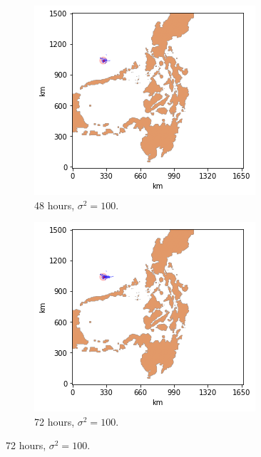 \documentclass[11pt, english]{article}
\begin{document}
\begin{multicols}{2}
\begin{figure}
	\begin{subfigure}{0.33\textwidth}
		\centering
		\caption{48 hours, $\sigma^{2} = 100$.}
		\label{fig:toy-48-100}
		\includegraphics[width=\textwidth]{toy-48-100}
	\end{subfigure}\hfill
	\begin{subfigure}{0.33\textwidth}
		\centering
		\caption{72 hours, $\sigma^{2} = 100$.}
		\label{fig:toy-72-100}
		\includegraphics[width=\textwidth]{toy-72-100}
	\end{subfigure}

\end{figure}
\end{multicols}
\end{document}
